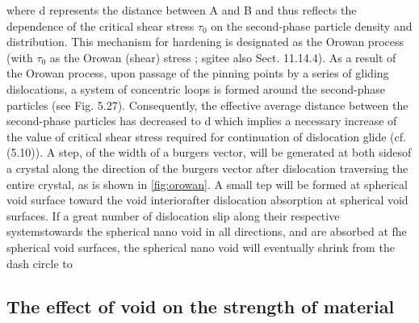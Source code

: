 \documentclass[materials,article,submit,moreauthors,pdftex,10pt,a4paper]{Definitions/mdpi}
\begin{document}
where d represents the distance between A and B and thus reflects the dependence of the critical shear stress $\tau_0$ on the second-phase particle density and distribution. This mechanism for hardening is designated as the Orowan process (with $\tau_0$ as the Orowan
(shear) stress ; sgitee also Sect. 11.14.4). As a result of the Orowan process, upon passage of the pinning points by a series of gliding dislocations, a system of concentric loops is formed around the second-phase particles (see Fig. 5.27). Consequently, the effective average distance between the second-phase particles has decreased to d which implies a necessary increase of the value of critical shear stress required for continuation of dislocation glide (cf. (5.10)).
A step, of the width of a burgers vector, will be generated at both sidesof a crystal along the direction of the burgers vector after dislocation traversing the entire crystal, as is shown in \ref{fig:orowan}. A small tep will be formed at spherical void surface toward the void interiorafter dislocation absorption at spherical void surfaces. If a great number of dislocation slip along their respective systemstowards the spherical nano void in all directions, and are absorbed at fhe spherical void surfaces, the spherical nano void will eventually shrink from the dash circle to


\subsection{The effect of void on the strength of material}
\end{document}
